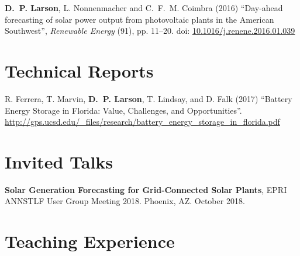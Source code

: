 \documentclass[10pt]{res}
\begin{document}
\begin{resume}
\textbf{D.~P. Larson}, L. Nonnenmacher and C.~F.~M. Coimbra (2016) ``Day-ahead forecasting of solar power output from photovoltaic plants in the American Southwest'', \textit{Renewable Energy} (91), pp. 11--20. doi: \href{http://dx.doi.org/10.1016/j.renene.2016.01.039}{10.1016/j.renene.2016.01.039}


%
\section{Technical Reports}
\vspace{0.1in}

R. Ferrera, T. Marvin, \textbf{D.~P. Larson}, T. Lindsay, and D. Falk (2017) ``Battery Energy Storage in Florida: Value, Challenges, and Opportunities''. \url{http://gps.ucsd.edu/_files/research/battery_energy_storage_in_florida.pdf}


\section{Invited Talks}
\vspace{0.1in}

\textbf{Solar Generation Forecasting for Grid-Connected Solar Plants}, EPRI ANNSTLF User Group Meeting 2018. Phoenix, AZ. October 2018.





\section{Teaching Experience}
\vspace{0.1in}


\end{resume}
\end{document}
